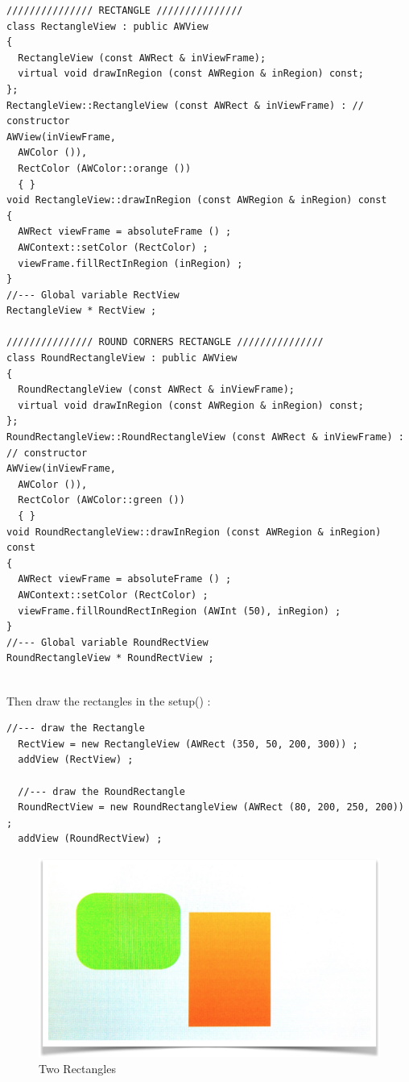 \documentclass[a4paper,11pt]{extarticle}
\begin{document}
\begin{lstlisting}[language=Arduinonl]
/////////////// RECTANGLE ///////////////
class RectangleView : public AWView
{
  RectangleView (const AWRect & inViewFrame);
  virtual void drawInRegion (const AWRegion & inRegion) const;
};
RectangleView::RectangleView (const AWRect & inViewFrame) : // constructor
AWView(inViewFrame, 
  AWColor ()),             
  RectColor (AWColor::orange ()) 
  { }
void RectangleView::drawInRegion (const AWRegion & inRegion) const
{
  AWRect viewFrame = absoluteFrame () ;
  AWContext::setColor (RectColor) ;
  viewFrame.fillRectInRegion (inRegion) ;
}
//--- Global variable RectView
RectangleView * RectView ;

/////////////// ROUND CORNERS RECTANGLE ///////////////
class RoundRectangleView : public AWView
{
  RoundRectangleView (const AWRect & inViewFrame);
  virtual void drawInRegion (const AWRegion & inRegion) const;
};
RoundRectangleView::RoundRectangleView (const AWRect & inViewFrame) : // constructor
AWView(inViewFrame, 
  AWColor ()),             
  RectColor (AWColor::green ()) 
  { }
void RoundRectangleView::drawInRegion (const AWRegion & inRegion) const
{
  AWRect viewFrame = absoluteFrame () ;
  AWContext::setColor (RectColor) ;
  viewFrame.fillRoundRectInRegion (AWInt (50), inRegion) ;
}
//--- Global variable RoundRectView
RoundRectangleView * RoundRectView ;
\end{lstlisting}

~\\ Then draw the rectangles in the setup() :

\begin{lstlisting}[language=Arduinonl]
  //--- draw the Rectangle
  RectView = new RectangleView (AWRect (350, 50, 200, 300)) ;
  addView (RectView) ;   
  
  //--- draw the RoundRectangle
  RoundRectView = new RoundRectangleView (AWRect (80, 200, 250, 200)) ;
  addView (RoundRectView) ;   
\end{lstlisting}

\begin{figure}[htbp]
   \centering
   \includegraphics[scale=0.55]{AWFig7.png} 
   \caption{Two Rectangles}
   \label{fig:7}
\end{figure}
\end{document}
